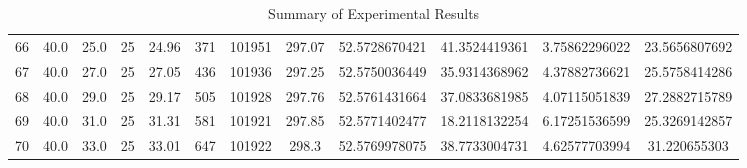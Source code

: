 \begin{table}[H]
\begin{center}
\begin{tabular}{|cccccccccccc|}
	66 & 40.0 & 25.0 & 25 & 24.96 & 371 & 101951 & 297.07 & 52.5728670421 & 41.3524419361 & 3.75862296022 & 23.5656807692\\
	67 & 40.0 & 27.0 & 25 & 27.05 & 436 & 101936 & 297.25 & 52.5750036449 & 35.9314368962 & 4.37882736621 & 25.5758414286\\
	68 & 40.0 & 29.0 & 25 & 29.17 & 505 & 101928 & 297.76 & 52.5761431664 & 37.0833681985 & 4.07115051839 & 27.2882715789\\
	69 & 40.0 & 31.0 & 25 & 31.31 & 581 & 101921 & 297.85 & 52.5771402477 & 18.2118132254 & 6.17251536599 & 25.3269142857\\
	70 & 40.0 & 33.0 & 25 & 33.01 & 647 & 101922 & 298.3 & 52.5769978075 & 38.7733004731 & 4.62577703994 & 31.220655303\\
	\hline
\end{tabular}
\caption{Summary of Experimental Results}
\label{table:experiment_results_summary}
\end{center}
\end{table}
\renewcommand\baselinestretch{2}\selectfont
